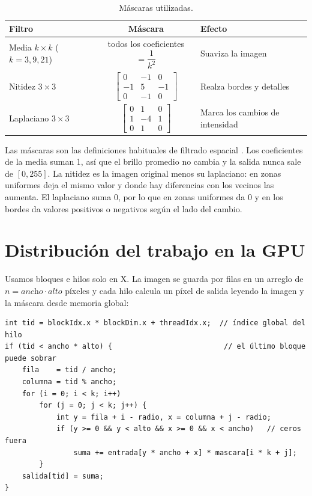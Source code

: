 \documentclass[12pt]{article}
\begin{document}
\begin{table}[H]
\centering
\caption{Máscaras utilizadas.}
\begin{tabular}{lcl}
\toprule
Filtro & Máscara & Efecto \\
\midrule
Media $k\times k$ ($k=3,9,21$) & todos los coeficientes $= \dfrac{1}{k^2}$ &
  Suaviza la imagen \\[2ex]
Nitidez $3\times3$ & $\begin{bmatrix}0&-1&0\\-1&5&-1\\0&-1&0\end{bmatrix}$ &
  Realza bordes y detalles \\[4ex]
Laplaciano $3\times3$ & $\begin{bmatrix}0&1&0\\1&-4&1\\0&1&0\end{bmatrix}$ &
  Marca los cambios de intensidad \\
\bottomrule
\end{tabular}
\end{table}

Las máscaras son las definiciones habituales de filtrado espacial \cite{gonzalez2018}. Los
coeficientes de la media suman 1, así que el brillo promedio no cambia y la salida nunca sale
de $[0,255]$. La nitidez es la imagen original menos su laplaciano: en zonas uniformes deja el
mismo valor y donde hay diferencias con los vecinos las aumenta. El laplaciano suma 0, por lo
que en zonas uniformes da 0 y en los bordes da valores positivos o negativos según el lado del
cambio.

\section{Distribución del trabajo en la GPU}

Usamos bloques e hilos solo en X. La imagen se guarda por filas en un arreglo de
$n=\textit{ancho}\cdot\textit{alto}$ píxeles y cada hilo calcula un píxel de salida leyendo la
imagen y la máscara desde memoria global:

\begin{lstlisting}
int tid = blockIdx.x * blockDim.x + threadIdx.x;  // índice global del hilo
if (tid < ancho * alto) {                          // el último bloque puede sobrar
    fila    = tid / ancho;
    columna = tid % ancho;
    for (i = 0; i < k; i++)
        for (j = 0; j < k; j++) {
            int y = fila + i - radio, x = columna + j - radio;
            if (y >= 0 && y < alto && x >= 0 && x < ancho)   // ceros fuera
                suma += entrada[y * ancho + x] * mascara[i * k + j];
        }
    salida[tid] = suma;
}
\end{lstlisting}
\end{document}
